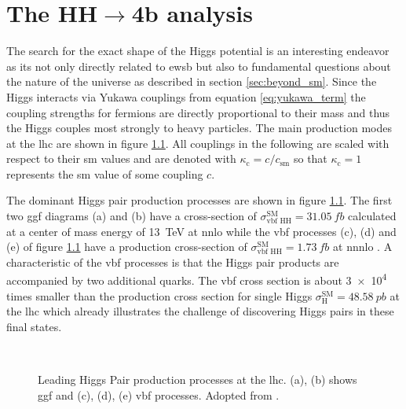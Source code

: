 \chapter{The HH$\rightarrow$4b analysis}

The search for the exact shape of the Higgs potential is an interesting endeavor as its not only  directly related to \ac{ewsb} but also to fundamental questions about the nature of the universe as described in section \ref{sec:beyond_sm}. Since the Higgs interacts via Yukawa couplings from equation \ref{eq:yukawa_term} the coupling strengths for fermions are directly proportional to their mass and thus the Higgs couples most strongly to heavy particles. The main production modes at the \ac{lhc} are shown in figure \ref{fig:main_production_processes}. All couplings in the following are scaled with respect to their \ac{sm} values and are denoted with $\kappa_\mathrm{c} = c/c_\mathrm{sm}$ so that $\kappa_\mathrm{c}=1$ represents the \ac{sm} value of some coupling $c$.

The dominant Higgs pair production processes are shown in figure \ref{fig:main_production_processes}. The first two \ac{ggf} diagrams (a) and (b) have a cross-section of
$\sigma_\text{vbf HH}^\text{SM}=\qty[]{31.05}{fb}$ calculated at a center of mass energy of \qty[]{13}{TeV} at \ac{nnlo} \citep{Grazzini_2018} while the \ac{vbf} processes (c), (d) and (e) of figure \ref{fig:main_production_processes} have a production cross-section of
$\sigma_\text{vbf HH}^\text{SM}=\qty[]{1.73}{fb}$ at \ac{nnnlo} \citep{PhysRevD.98.114016}. A characteristic of the \ac{vbf} processes is that the Higgs pair products are accompanied by two additional quarks. The \ac{vbf} cross section is about \qty[]{3e4}{} times smaller than the production cross section for single Higgs $\sigma_\text{H}^\text{SM}=\qty[]{48.58}{pb}$ at the \ac{lhc} \citep{de2016arxiv} which already illustrates the challenge of discovering Higgs pairs in these final states.
\begin{figure}
    \centering
    \hspace{.06\textwidth}
     \\
    \hspace{.01\textwidth}
    \hspace{.01\textwidth}
    \caption[]{Leading Higgs Pair production processes at the \ac{lhc}. (a), (b) shows \ac{ggf} and (c), (d), (e) \ac{vbf} processes. Adopted from \citep{aad2023search}.}
    \label{fig:main_production_processes}
\end{figure}

